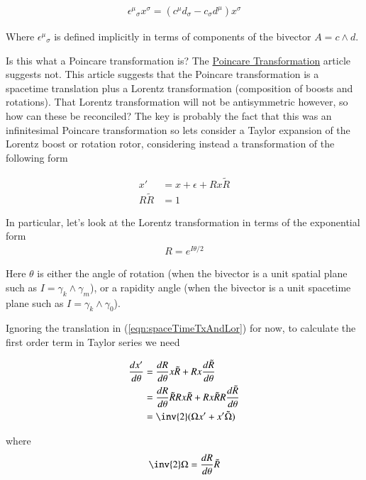 \begin{align*}
{\epsilon^\mu}_\sigma x^\sigma = (c^\mu d_\sigma -c_\sigma d^\mu ) x^\sigma 
\end{align*}

Where ${\epsilon^\mu}_\sigma$ is defined implicitly in terms of components of the bivector $A = c \wedge d$.

Is this what a Poincare transformation is?  The \href{http://mathworld.wolfram.com/PoincareTransformation.html}{Poincare Transformation} article suggests not.  This article suggests that the Poincare transformation is a spacetime translation plus
a Lorentz transformation (composition of boosts and rotations).  That Lorentz transformation will not be antisymmetric
however, so how can these be reconciled?  The key is probably the fact that this was an infinitesimal Poincare transformation
so lets consider a Taylor expansion of the Lorentz boost or rotation rotor, considering instead a transformation of the 
following form

\begin{align}\label{eqn:spaceTimeTxAndLor}
x' &= x + \epsilon + R x \tilde{R} \\
R \tilde{R} &= 1
\end{align}

In particular, let's look at the Lorentz transformation in terms of the exponential form
\begin{align*}
R = e^{I \theta/2}
\end{align*}

Here $\theta$ is either the angle of rotation (when the bivector is a unit spatial plane such as $I = \gamma_k \wedge \gamma_m$), or a rapidity angle (when the bivector is a unit spacetime plane such as $I = \gamma_k \wedge \gamma_0$).

Ignoring the translation in (\ref{eqn:spaceTimeTxAndLor}) for now, to calculate the first order term in Taylor series we need

\begin{align*}
\frac{dx'}{d\theta} 
&= 
\frac{dR}{d\theta}  x \tilde{R} 
+
{R} x \frac{d\tilde{R}}{d\theta}  
\\
&= 
\frac{dR}{d\theta} \tilde{R} R x \tilde{R} 
+
{R} x \tilde{R} R \frac{d\tilde{R}}{d\theta}  
\\
&=
\inv{2} ( \Omega x' + x' \tilde{\Omega} ) \\
\end{align*}

where 
\begin{align*}
\inv{2}\Omega = \frac{dR}{d\theta} \tilde{R} 
\end{align*}

